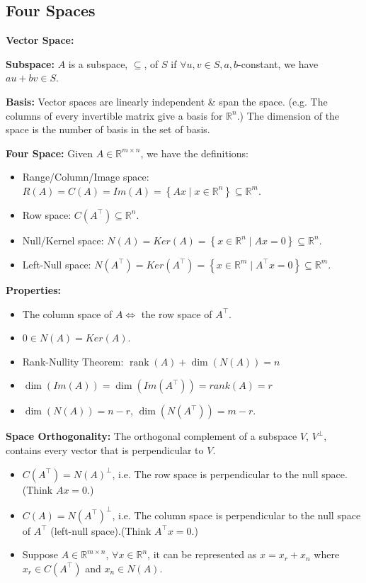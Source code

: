 \documentclass[13pt]{article}
\theoremstyle{definition}
\theoremstyle{remark}
\begin{document}
\begin{multicols}{2}
\section{Four Spaces}
\textbf{Vector Space:}

\textbf{Subspace:}  $A$ is a subspace, $\subseteq$, of $S$ if $\forall u, v \in S, a, b$-constant, we have
$au + bv \in S$.

\textbf{Basis:} Vector spaces are linearly independent \& span the space. (e.g. The columns of every invertible matrix give a basis for $\mathbb{R}^n$.) The dimension of the space is the number of basis in the set of basis.

\textbf{Four Space:} Given $A \in \mathbb{R}^{m \times n}$, we have the definitions:
\begin{itemize}
    \item Range/Column/Image space: $R(A)=C(A)=Im(A)=\left\{A x \mid x \in \mathbb{R}^{n}\right\} \subseteq \mathbb{R}^{m}$.
    \item Row space: $C(A^\top)\subseteq \mathbb{R}^{n}$.
    \item Null/Kernel space: $N(A)=Ker(A)=\left\{x \in \mathbb{R}^{n} \mid A x=0\right\}\subseteq \mathbb{R}^{n}$.
    \item Left-Null space: $N(A^\top)=Ker(A^\top)=\left\{x \in \mathbb{R}^{m} \mid A^\top x=0\right\}\subseteq \mathbb{R}^{m}$.
\end{itemize}
\textbf{Properties:}
\begin{itemize} 
  \item The column space of $A \Longleftrightarrow$ the row space of $A^\top$. 
  \item $0\in N(A)=Ker(A)$.
  \item Rank-Nullity Theorem: $\operatorname{rank}(A)+\operatorname{dim}(N(A))=n$
  \item $\operatorname{dim}(Im(A)) = \operatorname{dim}(Im(A^\top)) = rank(A) = r$
  \item $\operatorname{dim}(N(A)) = n - r$, $\operatorname{dim}(N(A^\top)) = m - r$.
\end{itemize}

\textbf{Space Orthogonality:}
The orthogonal complement of a subspace $V$, $V^\perp$, contains every vector that is perpendicular to $V$.
\begin{itemize}
  \item $C(A^\top) = N(A)^\perp$, i.e. The row space is perpendicular to the null space. (Think $Ax = 0$.)
  \item $C(A) = N(A^\top)^\perp$, i.e. The column space is perpendicular to the null space of $A^\top$ (left-null space).(Think $A^\top x = 0$.)
  \item Suppose $A\in \mathbb{R}^{m\times n}$, $\forall x\in \mathbb{R}^n$, it can be represented as $x = x_r + x_n$ where $x_r \in C(A^\top)$ and $x_n \in N(A)$.
\end{itemize}


\end{multicols}
\end{document}

